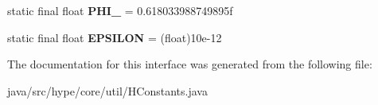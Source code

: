 \begin{DoxyCompactItemize}
\item 
\hypertarget{interfacehype_1_1core_1_1util_1_1_h_constants_a38004c29ec77f13033b3a5993a7d4818}{static final float {\bfseries P\-H\-I\-\_} = 0.\-618033988749895f}\label{interfacehype_1_1core_1_1util_1_1_h_constants_a38004c29ec77f13033b3a5993a7d4818}

\item 
\hypertarget{interfacehype_1_1core_1_1util_1_1_h_constants_af58dd23b7edb42a36cd6cae38a7174bf}{static final float {\bfseries E\-P\-S\-I\-L\-O\-N} = (float)10e-\/12}\label{interfacehype_1_1core_1_1util_1_1_h_constants_af58dd23b7edb42a36cd6cae38a7174bf}

\end{DoxyCompactItemize}


The documentation for this interface was generated from the following file\-:\begin{DoxyCompactItemize}
\item 
java/src/hype/core/util/H\-Constants.\-java\end{DoxyCompactItemize}
